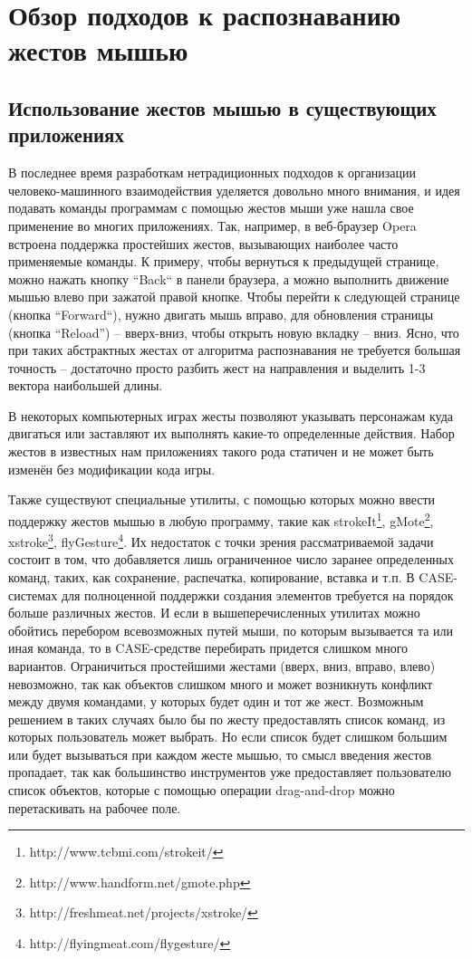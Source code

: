 \documentclass[a5paper]{article}
\begin{document}
\section{Обзор подходов к распознаванию жестов мышью}

\subsection{Использование жестов мышью в существующих приложениях}

В последнее время разработкам нетрадиционных подходов к организации человеко-машинного взаимодействия уделяется довольно много внимания, и идея подавать команды программам с помощью жестов мыши уже нашла свое применение во многих приложениях. Так, например, в веб-браузер Opera встроена поддержка простейших жестов, вызывающих наиболее часто применяемые команды. К примеру, чтобы вернуться к предыдущей странице, можно нажать кнопку ``Back`` в панели браузера, а можно выполнить движение мышью влево при зажатой правой кнопке. Чтобы перейти к следующей странице (кнопка ``Forward``), нужно двигать мышь вправо, для обновления страницы (кнопка ``Reload'') -- вверх-вниз, чтобы открыть новую вкладку -- вниз. Ясно, что при таких абстрактных жестах от алгоритма распознавания не требуется большая точность -- достаточно просто разбить жест на направления и выделить 1-3 вектора наибольшей длины.

В некоторых компьютерных играх жесты позволяют указывать персонажам куда двигаться или заставляют их выполнять какие-то определенные действия. Набор жестов в известных нам приложениях такого рода статичен и не может быть изменён без модификации кода игры.

Также существуют специальные утилиты, с помощью которых можно ввести поддержку жестов мышью в любую программу, такие как strokeIt\footnote{http://www.tcbmi.com/strokeit/}, gMote\footnote{http://www.handform.net/gmote.php}, xstroke\footnote{http://freshmeat.net/projects/xstroke/}, flyGesture\footnote{http://flyingmeat.com/flygesture/}. Их недостаток с точки зрения рассматриваемой задачи состоит в том, что добавляется лишь ограниченное число заранее определенных команд, таких, как сохранение, распечатка, копирование, вставка и т.п. В CASE-системах для полноценной поддержки создания элементов требуется на порядок больше различных жестов. И если в вышеперечисленных утилитах можно обойтись перебором всевозможных путей мыши, по которым вызывается та или иная команда, то в CASE-средстве перебирать придется слишком много вариантов. Ограничиться простейшими жестами (вверх, вниз, вправо, влево) невозможно, так как объектов слишком много и может возникнуть конфликт между двумя командами, у которых будет один и тот же жест. Возможным решением в таких случаях было бы по жесту предоставлять список команд, из которых пользователь может выбрать. Но если список будет слишком большим или будет вызываться при каждом жесте мышью, то смысл введения жестов пропадает, так как большинство инструментов уже предоставляет пользователю список объектов, которые с помощью операции drag-and-drop можно перетаскивать на рабочее поле.
\end{document}
